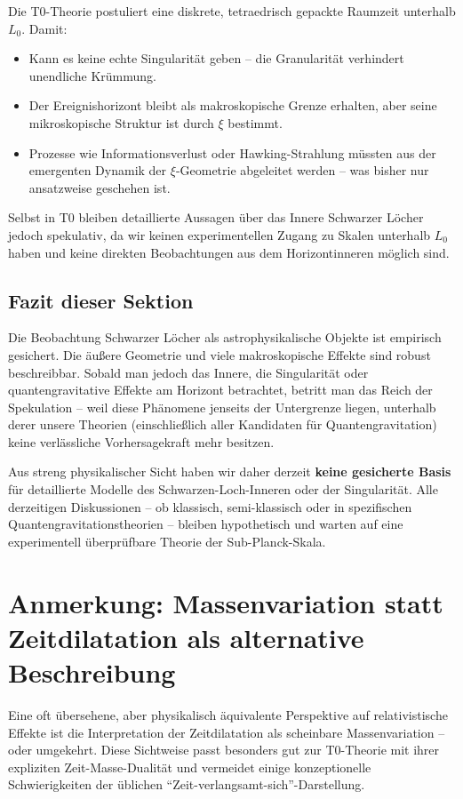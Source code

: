 Die T0-Theorie postuliert eine diskrete, tetraedrisch gepackte Raumzeit unterhalb \(L_0\). Damit:
\begin{itemize}
	\item Kann es keine echte Singularität geben – die Granularität verhindert unendliche Krümmung.
	\item Der Ereignishorizont bleibt als makroskopische Grenze erhalten, aber seine mikroskopische Struktur ist durch \(\xi\) bestimmt.
	\item Prozesse wie Informationsverlust oder Hawking-Strahlung müssten aus der emergenten Dynamik der \(\xi\)-Geometrie abgeleitet werden – was bisher nur ansatzweise geschehen ist.
\end{itemize}

Selbst in T0 bleiben detaillierte Aussagen über das Innere Schwarzer Löcher jedoch spekulativ, da wir keinen experimentellen Zugang zu Skalen unterhalb \(L_0\) haben und keine direkten Beobachtungen aus dem Horizontinneren möglich sind.

\subsection{Fazit dieser Sektion}

Die Beobachtung Schwarzer Löcher als astrophysikalische Objekte ist empirisch gesichert. Die äußere Geometrie und viele makroskopische Effekte sind robust beschreibbar. Sobald man jedoch das Innere, die Singularität oder quantengravitative Effekte am Horizont betrachtet, betritt man das Reich der Spekulation – weil diese Phänomene jenseits der Untergrenze liegen, unterhalb derer unsere Theorien (einschließlich aller Kandidaten für Quantengravitation) keine verlässliche Vorhersagekraft mehr besitzen.

Aus streng physikalischer Sicht haben wir daher derzeit \textbf{keine gesicherte Basis} für detaillierte Modelle des Schwarzen-Loch-Inneren oder der Singularität. Alle derzeitigen Diskussionen – ob klassisch, semi-klassisch oder in spezifischen Quantengravitationstheorien – bleiben hypothetisch und warten auf eine experimentell überprüfbare Theorie der Sub-Planck-Skala.
\section{Anmerkung: Massenvariation statt Zeitdilatation als alternative Beschreibung}

Eine oft übersehene, aber physikalisch äquivalente Perspektive auf relativistische Effekte ist die Interpretation der Zeitdilatation als scheinbare Massenvariation – oder umgekehrt. Diese Sichtweise passt besonders gut zur T0-Theorie mit ihrer expliziten Zeit-Masse-Dualität und vermeidet einige konzeptionelle Schwierigkeiten der üblichen ``Zeit-verlangsamt-sich''-Darstellung.

